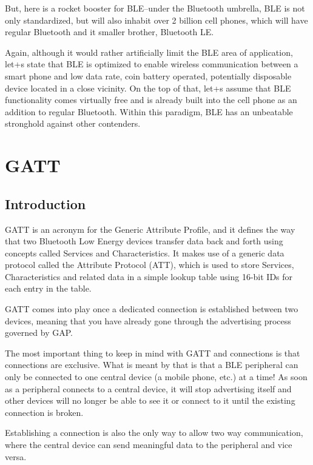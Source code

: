 \documentclass[11pt,a4paper]{article}
\begin{document}
{ 

But, here is a rocket booster for BLE--under the Bluetooth umbrella, BLE is not only standardized, but will also inhabit over 2 billion cell phones, which will have regular Bluetooth and it smaller brother, Bluetooth LE.

 

Again, although it would rather artificially limit the BLE area of application, let+s state that BLE is optimized to enable wireless communication between a smart phone and low data rate, coin battery operated, potentially disposable device located in a close vicinity. On the top of that, let+s assume that BLE functionality comes virtually free and is already built into the cell phone as an addition to regular Bluetooth. Within this paradigm, BLE has an unbeatable stronghold against other contenders.
	}
	
	
	
	    \newpage
		\section{GATT}
		\subsection{Introduction }
	{
    GATT is an acronym for the Generic Attribute Profile, and it defines the way that two Bluetooth Low Energy devices transfer data back and forth using concepts called Services and Characteristics. It makes use of a generic data protocol called the Attribute Protocol (ATT), which is used to store Services, Characteristics and related data in a simple lookup table using 16-bit IDs for each entry in the table.

GATT comes into play once a dedicated connection is established between two devices, meaning that you have already gone through the advertising process governed by GAP.

The most important thing to keep in mind with GATT and connections is that connections are exclusive. What is meant by that is that a BLE peripheral can only be connected to one central device (a mobile phone, etc.) at a time! As soon as a peripheral connects to a central device, it will stop advertising itself and other devices will no longer be able to see it or connect to it until the existing connection is broken.

Establishing a connection is also the only way to allow two way communication, where the central device can send meaningful data to the peripheral and vice versa.
	}
	\newpage
\end{document}
